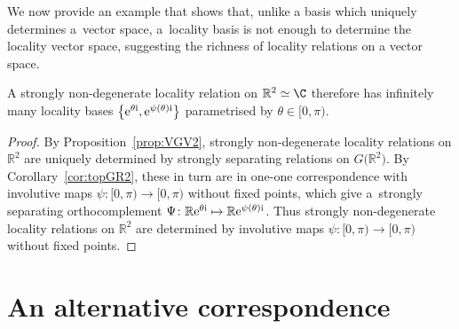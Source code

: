\documentclass[pdftex]{sigma}
\numberwithin{equation}{section}
\newcommand{\R}{\mathbb{R}}
\begin{document}
We now provide an example that shows that, unlike a basis which uniquely determines a~vector space, a~locality basis is not enough to determine the locality vector space, suggesting the richness of locality relations on a vector space.

\begin{Remark}
	A strongly non-degenerate locality relation on $\R^2\simeq \C$ therefore has infinitely many locality bases $\big\{{\rm e}^{\theta {\rm i}}, {\rm e}^{\psi(\theta){\rm i}}\big\}$ parametrised by $\theta\in [0, \pi)$.
\end{Remark}
\begin{proof}By Proposition~\ref{prop:VGV2}, strongly non-degenerate locality relations on $\R^2$ are uniquely deter\-mi\-ned by strongly separating relations on $G\big(\R^2\big)$. By Corollary~\ref{cor:topGR2}, these in turn are in one-one correspondence with involutive maps $\psi\colon [0,\pi)\to [0, \pi)$ without fixed points, which give a~strongly separating orthocomplement $\Psi\colon \R {\rm e}^{\theta {\rm i}}\mapsto \R {\rm e}^{\psi(\theta){\rm i}}$. Thus strongly non-degenerate loca\-lity relations on $\R^2$ are determined by involutive maps $\psi\colon [0,\pi)\to [0, \pi)$ without fixed points. \end{proof}

\appendix
\section{An alternative correspondence}
\end{document}
